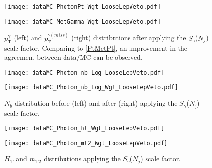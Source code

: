 \begin{figure}[H]
\begin{center}
\begin{minipage}[b]{0.45\textwidth}
    \texttt{[image: dataMC\_PhotonPt\_Wgt\_LooseLepVeto.pdf]}
\end{minipage}
\begin{minipage}[b]{0.45\textwidth}
    \texttt{[image: dataMC\_MetGamma\_Wgt\_LooseLepVeto.pdf]}
\end{minipage}
\end{center}
\vspace{-1em}
\caption{$p_\text{T}^\gamma$ (left) and $p_\text{T}^{\gamma (miss)}$ (right) distributions after applying the $S_\gamma$($N_j$) scale factor. Comparing to \autoref{PtMetPt}, an improvement in the agreement between data/MC can be observed.}
\label{PtMetPtCorr}
\end{figure}

\vspace {1em}

\begin{figure}[H]
\begin{center}
\begin{minipage}[b]{0.45\textwidth}
    \texttt{[image: dataMC\_Photon\_nb\_Log\_LooseLepVeto.pdf]}
\end{minipage}
\begin{minipage}[b]{0.45\textwidth}
    \texttt{[image: dataMC\_Photon\_nb\_Log\_Wgt\_LooseLepVeto.pdf]}
\end{minipage}
\end{center}
\vspace{-1em}
\caption{$N_b$ distribution before (left) and after (right) applying the $S_\gamma$($N_j$) scale factor. }
\end{figure}


\begin{figure}[tb]
\begin{center}
\begin{minipage}[b]{0.45\textwidth}
    \texttt{[image: dataMC\_Photon\_ht\_Wgt\_LooseLepVeto.pdf]}
\end{minipage}
\begin{minipage}[b]{0.45\textwidth}
    \texttt{[image: dataMC\_Photon\_mt2\_Wgt\_LooseLepVeto.pdf]}
\end{minipage}
\end{center}
\vspace{-1em}
\caption{$H_\text{T}$ and $m_\text{T2}$ distributions applying the $S_\gamma$($N_j$) scale factor. }
\end{figure}

